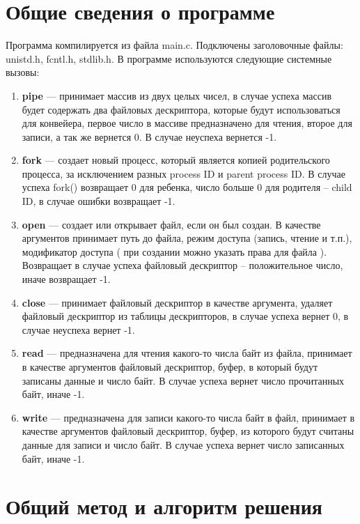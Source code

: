 \section{Общие сведения о программе}

Программа компилируется из файла main.c. Подключены заголовочные файлы: unistd.h, fcntl.h, stdlib.h. В программе используются следующие системные вызовы:

\begin{enumerate}
    \item \textbf{pipe} –– принимает массив из двух целых чисел, в случае успеха массив будет содержать два файловых дескриптора, которые будут использоваться для конвейера, первое число в массиве предназначено для чтения, второе для записи, а так же вернется 0. В случае неуспеха вернется -1.
    \item \textbf{fork} –– создает новый процесс, который является копией родительского процесса, за исключением разных process ID и parent process ID. В случае успеха fork() возвращает 0 для ребенка, число больше 0 для родителя – child ID, в случае ошибки возвращает -1.
    \item \textbf{open} –– создает или открывает файл, если он был создан. В качестве аргументов принимает путь до файла, режим доступа (запись, чтение и т.п.),  модификатор доступа ( при создании можно указать права для файла ). Возвращает в случае успеха файловый дескриптор – положительное число, иначе возвращает -1.
    \item \textbf{close} –– принимает файловый дескриптор в качестве аргумента, удаляет файловый дескриптор из таблицы дескрипторов, в случае успеха вернет 0, в случае неуспеха вернет -1.
    \item \textbf{read} –– предназначена для чтения какого-то числа байт из файла, принимает в качестве аргументов файловый дескриптор, буфер, в который будут записаны данные и число байт. В случае успеха вернет число прочитанных байт, иначе -1.
    \item \textbf{write} –– предназначена для записи какого-то числа байт в файл, принимает в качестве аргументов файловый дескриптор, буфер, из которого будут считаны данные для записи и число байт. В случае успеха вернет число записанных байт, иначе -1.
\end{enumerate}

\pagebreak

\section{Общий метод и алгоритм решения}

